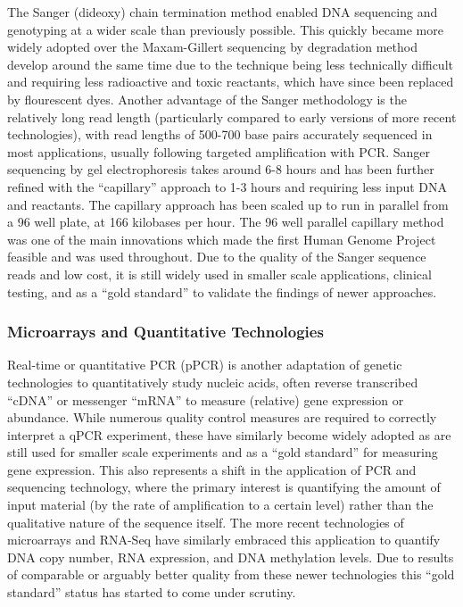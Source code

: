 The Sanger (dideoxy) chain termination method enabled DNA sequencing and genotyping at a wider scale than previously possible. This quickly became more widely adopted  over the Maxam-Gillert sequencing by degradation method develop around the same time due to the technique being less technically difficult and requiring less radioactive and toxic reactants, which have since been replaced by flourescent dyes. Another advantage of the Sanger methodology is the relatively long read length (particularly compared to early versions of more recent technologies), with read lengths of 500-700 base pairs accurately sequenced in most applications, usually following targeted amplification with PCR. Sanger sequencing by gel electrophoresis takes around 6-8 hours and has been further refined with the ``capillary'' approach to 1-3 hours and requiring less input DNA and reactants. The capillary approach has been scaled up to run in parallel from a 96 well plate, at 166 kilobases per hour. The 96 well parallel capillary method was one of the main innovations which made the first Human Genome Project feasible and was used throughout. Due to the quality of the Sanger sequence reads and low cost, it is still widely used in smaller scale applications, clinical testing, and as a ``gold standard'' to validate the findings of newer approaches.


\subsubsection{Microarrays and Quantitative Technologies}
Real-time or quantitative PCR (pPCR) is another adaptation of genetic technologies to quantitatively study nucleic acids, often reverse transcribed ``cDNA'' or messenger ``mRNA'' to measure (relative) gene expression or abundance. While numerous quality control measures are required to correctly interpret a qPCR experiment, these have similarly become widely adopted as are still used for smaller scale experiments and as a ``gold standard'' for measuring gene expression. This also represents a shift in the application of PCR and sequencing technology, where the primary interest is quantifying the amount of input material (by the rate of amplification to a certain level) rather than the qualitative nature of the sequence itself. The more recent technologies of microarrays and RNA-Seq have similarly embraced this application to quantify DNA copy number, RNA expression, and DNA methylation levels. Due to results of comparable or arguably better quality from these newer technologies this ``gold standard'' status has started to come under scrutiny.

